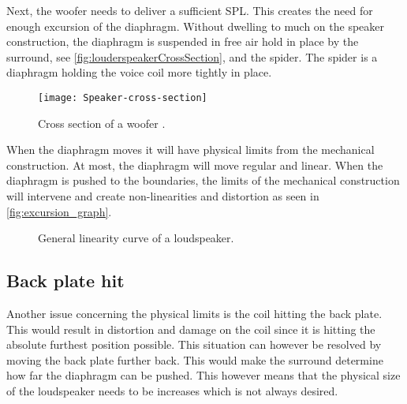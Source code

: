 Next, the woofer needs to deliver a sufficient \gls{SPL}. This creates the need for enough excursion of the diaphragm. Without dwelling to much on the speaker construction, the diaphragm is suspended in free air hold in place by the surround, see \autoref{fig:louderspeakerCrossSection}, and the spider. The spider is a diaphragm holding the voice coil more tightly in place. 

\begin{figure}[H]
\centering
\texttt{[image: Speaker-cross-section]}
\caption{Cross section of a woofer \citep{sou:crossSection}.}
\label{fig:louderspeakerCrossSection}
\end{figure}

When the diaphragm moves it will have physical limits from the mechanical construction. At most, the diaphragm will move regular and linear. When the diaphragm is pushed to the boundaries, the limits of the mechanical construction will intervene and create non-linearities and distortion as seen in \autoref{fig:excursion_graph}. %

\begin{figure}[H]
\centering
{}

\caption{General linearity curve of a loudspeaker.}
\label{fig:excursion_graph}
\end{figure}





\subsection*{Back plate hit}\label{subsec:impulses}
Another issue concerning the physical limits is the coil hitting the back plate. This would result in distortion and damage on the coil since it is hitting the absolute furthest position possible. This situation can however be resolved by moving the back plate further back. This would make the surround determine how far the diaphragm can be pushed. This however means that the physical size of the loudspeaker needs to be increases which is not always desired.

% 


